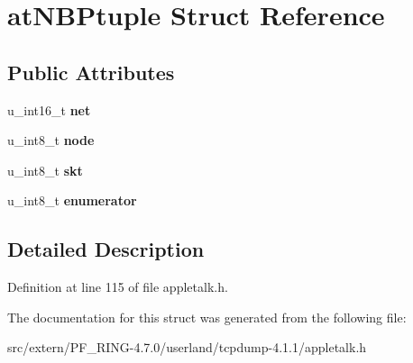 \hypertarget{structat_n_b_ptuple}{
\section{atNBPtuple Struct Reference}
\label{structat_n_b_ptuple}
}
\subsection*{Public Attributes}
\begin{DoxyCompactItemize}
\item 
\hypertarget{structat_n_b_ptuple_a4382c1222462f4b1c938f073a2901d08}{
u\_\-int16\_\-t {\bfseries net}}
\label{structat_n_b_ptuple_a4382c1222462f4b1c938f073a2901d08}

\item 
\hypertarget{structat_n_b_ptuple_ac845e36abe12009309aea5176f565e24}{
u\_\-int8\_\-t {\bfseries node}}
\label{structat_n_b_ptuple_ac845e36abe12009309aea5176f565e24}

\item 
\hypertarget{structat_n_b_ptuple_af75dc495b35de672ee59db2578c42d93}{
u\_\-int8\_\-t {\bfseries skt}}
\label{structat_n_b_ptuple_af75dc495b35de672ee59db2578c42d93}

\item 
\hypertarget{structat_n_b_ptuple_af43e268f366941cfe47465c49648dd6b}{
u\_\-int8\_\-t {\bfseries enumerator}}
\label{structat_n_b_ptuple_af43e268f366941cfe47465c49648dd6b}

\end{DoxyCompactItemize}


\subsection{Detailed Description}


Definition at line 115 of file appletalk.h.



The documentation for this struct was generated from the following file:\begin{DoxyCompactItemize}
\item 
src/extern/PF\_\-RING-\/4.7.0/userland/tcpdump-\/4.1.1/appletalk.h\end{DoxyCompactItemize}
